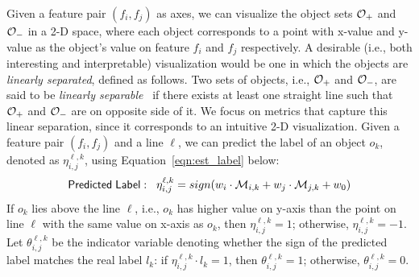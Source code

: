 Given a feature pair $(f_i,f_j)$ as axes, we can visualize the object sets ${\mathcal{O}}_+$ and ${\mathcal{O}}_-$ in a 2-D space, where each object corresponds to a point with x-value and y-value as the object's value on feature $f_i$ and $f_j$ respectively. A desirable (i.e., both interesting and interpretable) visualization would be one in which the objects are {\em linearly separated}, defined as follows. Two sets of objects, i.e., ${\mathcal{O}}_+$ and ${\mathcal{O}}_-$, are said to be \emph{linearly separable}~\cite{medin1981linear} if there exists at least one straight line such that ${\mathcal{O}}_+$ and ${\mathcal{O}}_-$ are on opposite side of it.
We focus on metrics that capture this linear separation, since it corresponds to an intuitive 2-D visualization.
Given a feature pair $(f_i,f_j)$ and a line $\ell$, we can predict the label of an object $o_k$, denoted as $\eta_{i,j}^{\ell,k}$, using Equation~\ref{eqn:est_label} below:
\begin{equation}\label{eqn:est_label}
{\sf Predicted \hspace{1mm} Label:}\hspace{3mm} \eta_{i,j}^{\ell,k}=sign(w_i\cdot {\mathcal{M}}_{i,k} + w_j\cdot {\mathcal{M}}_{j,k} +w_0)
\end{equation}
\noindent If $o_k$ lies above the line $\ell$, i.e., $o_k$ has higher value on y-axis than the point on line $\ell$ with the same value on x-axis as $o_k$, then $\eta_{i,j}^{\ell,k}=1$; otherwise, $\eta_{i,j}^{\ell,k}=-1$. Let $\theta_{i,j}^{\ell,k}$ be the indicator variable denoting whether  the sign of the predicted label matches the real label $l_k$\eat{)}: if $\eta_{i,j}^{\ell,k}\cdot l_k = 1$, then $\theta_{i,j}^{\ell,k} = 1$; otherwise, $\theta_{i,j}^{\ell,k} = 0$.
